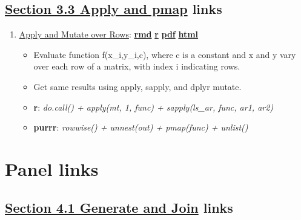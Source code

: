 \documentclass[
]{book}
\providecommand{\tightlist}{%
  \setlength{\itemsep}{0pt}\setlength{\parskip}{0pt}}
\begin{document}
\hypertarget{section-3.3-apply-and-pmapapply-and-pmap-links}{%
\subsection{\texorpdfstring{\protect\hyperlink{apply-and-pmap}{Section 3.3 Apply and pmap} links}{Section 3.3 Apply and pmap links}}\label{section-3.3-apply-and-pmapapply-and-pmap-links}}

\begin{enumerate}
\def\labelenumi{\arabic{enumi}.}
\tightlist
\item
  \href{https://fanwangecon.github.io/R4Econ/function/noloop/htmlpdfr/fs_applysapplymutate.html}{Apply and Mutate over Rows}: \href{https://github.com/FanWangEcon/R4Econ/blob/master/function/noloop//fs_applysapplymutate.Rmd}{\textbf{rmd}} \textbar{} \href{https://github.com/FanWangEcon/R4Econ/blob/master/function/noloop/htmlpdfr/fs_applysapplymutate.R}{\textbf{r}} \textbar{} \href{https://github.com/FanWangEcon/R4Econ/blob/master/function/noloop/htmlpdfr/fs_applysapplymutate.pdf}{\textbf{pdf}} \textbar{} \href{https://fanwangecon.github.io/R4Econ/function/noloop/htmlpdfr/fs_applysapplymutate.html}{\textbf{html}}

  \begin{itemize}
  \tightlist
  \item
    Evaluate function f(x\_i,y\_i,c), where c is a constant and x and y vary over each row of a matrix, with index i indicating rows.
  \item
    Get same results using apply, sapply, and dplyr mutate.
  \item
    \textbf{r}: \emph{do.call() + apply(mt, 1, func) + sapply(ls\_ar, func, ar1, ar2)}
  \item
    \textbf{purrr}: \emph{rowwise() + unnest(out) + pmap(func) + unlist()}
  \end{itemize}
\end{enumerate}

\hypertarget{panel-links}{%
\section{Panel links}\label{panel-links}}

\hypertarget{section-4.1-generate-and-joingenerate-and-join-links}{%
\subsection{\texorpdfstring{\protect\hyperlink{generate-and-join}{Section 4.1 Generate and Join} links}{Section 4.1 Generate and Join links}}\label{section-4.1-generate-and-joingenerate-and-join-links}}
\end{document}
